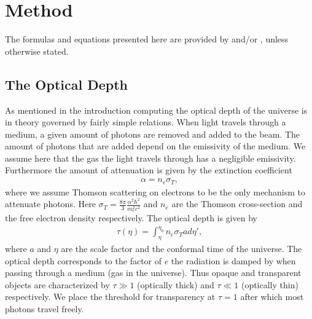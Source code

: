 \documentclass[twocolumn]{aastex62}
\begin{document}
\section{Method} \label{sec:Method}
The formulas and equations presented here are provided by \cite{winther:2020} and/or \cite{dodelson:2003}, unless otherwise stated.
\subsection{The Optical Depth}
As mentioned in the introduction computing the optical depth of the universe is in theory governed by fairly simple relations. When light travels through a medium, a given amount of photons are removed and added to the beam. The amount of photons that are added depend on the emissivity of the medium. We assume here that the gas the light travels through has a negligible emissivity. Furthermore the amount of attenuation is given by the extinction coefficient
\begin{align}
    \alpha = n_e\sigma_T,
\end{align}
where we assume Thomson scattering on electrons to be the only mechanism to attenuate photons. Here $\sigma_T = \frac{8\pi}{3}\frac{\alpha^2\hbar^2}{m_e^2c^2}$
and $n_e$ are the Thomson cross-section and the free electron density respectively. The optical depth is given by 
\begin{align}
    \tau(\eta) = \int_{\eta}^{\eta_0} n_e \sigma_T a d\eta',
\end{align}
where $a$ and $\eta$ are the scale factor and the conformal time of the universe.
The optical depth corresponds to the factor of $e$ the radiation is damped by when passing through a medium (gas in the universe). Thus opaque and transparent objects are characterized by $\tau \gg 1$ (optically thick) and $\tau \ll 1$ (optically thin) respectively. We place the threshold for transparency at $\tau = 1$ after which most photons travel freely.
\end{document}
